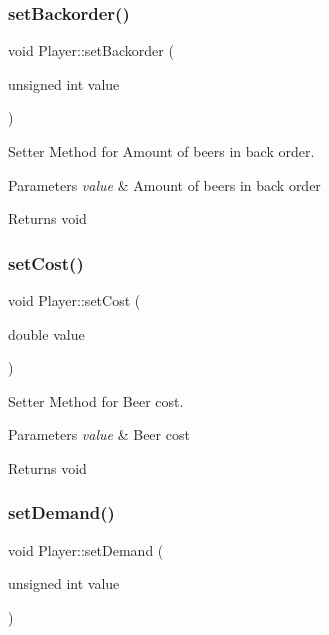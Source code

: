\subsubsection{\texorpdfstring{set\+Backorder()}{setBackorder()}}
{\footnotesize\ttfamily void Player\+::set\+Backorder (\begin{DoxyParamCaption}\item[{unsigned int}]{value }\end{DoxyParamCaption})}



Setter Method for Amount of beers in back order. 


\begin{DoxyParams}{Parameters}
{\em value} & Amount of beers in back order \\
\hline
\end{DoxyParams}
\begin{DoxyReturn}{Returns}
void 
\end{DoxyReturn}
\mbox{\label{classPlayer_a2fd1430d641ef17c52b0aae31e7e26bf}} 
\subsubsection{\texorpdfstring{set\+Cost()}{setCost()}}
{\footnotesize\ttfamily void Player\+::set\+Cost (\begin{DoxyParamCaption}\item[{double}]{value }\end{DoxyParamCaption})}



Setter Method for Beer cost. 


\begin{DoxyParams}{Parameters}
{\em value} & Beer cost \\
\hline
\end{DoxyParams}
\begin{DoxyReturn}{Returns}
void 
\end{DoxyReturn}
\mbox{\label{classPlayer_ad8d2808aaf6a627451a1d82f26d45812}} 
\subsubsection{\texorpdfstring{set\+Demand()}{setDemand()}}
{\footnotesize\ttfamily void Player\+::set\+Demand (\begin{DoxyParamCaption}\item[{unsigned int}]{value }\end{DoxyParamCaption})}



